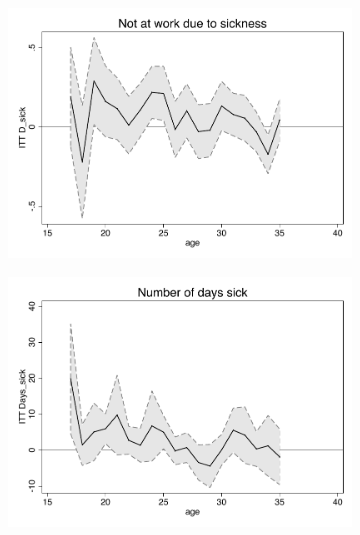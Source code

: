 \documentclass[a4paper ]{article}
\begin{document}
\begin{figure}[p]
\begin{minipage}{\textwidth}
\end{minipage}
\end{figure}
\newpage
\begin{figure}[p]
\begin{subfigure}[h]{0.48\textwidth}\centering
	\includegraphics[width=\textwidth]{../../analysis/graphs/SOEP/D_sick_LC.pdf}
\end{subfigure}
\quad
\begin{subfigure}[h]{0.48\textwidth}\centering
	\includegraphics[width=\textwidth]{../../analysis/graphs/SOEP/Days_sick_LC.pdf}
\end{subfigure}


\end{figure}
\end{document}
